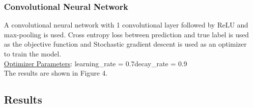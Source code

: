 \documentclass[letter, 10pt]{article}
\begin{document}
\subsubsection*{Convolutional Neural Network}
A convolutional neural network with 1 convolutional layer followed by ReLU and max-pooling is used. Cross entropy loss between prediction and true label is used as the objective function and Stochastic gradient descent is used as an optimizer to train the model.\\
\underline{Optimizer Parameters}: learning\_rate = 0.7\quad decay\_rate = 0.9\\
The results are shown in Figure 4.

\subsection*{Results}
\end{document}
